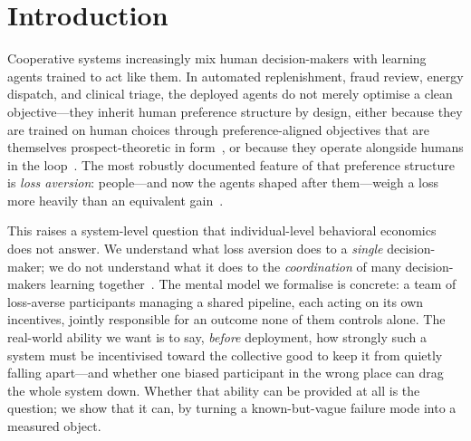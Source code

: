 \documentclass[letterpaper]{article}
\theoremstyle{plain}
\begin{document}
\section{Introduction}
\label{sec:intro}

Cooperative systems increasingly mix human decision-makers with learning agents
trained to act like them. In automated replenishment, fraud review, energy
dispatch, and clinical triage, the deployed agents do not merely optimise a
clean objective---they inherit human preference structure by design, either
because they are trained on human choices through preference-aligned objectives
that are themselves prospect-theoretic in form~\citep{ethayarajh2024kto}, or
because they operate alongside humans in the loop~\citep{lalmohammed2025}. The
most robustly documented feature of that preference structure is \emph{loss
aversion}: people---and now the agents shaped after them---weigh a loss more
heavily than an equivalent gain~\citep{kahneman1979,tversky1992}.

This raises a system-level question that individual-level behavioral economics
does not answer. We understand what loss aversion does to a \emph{single}
decision-maker; we do not understand what it does to the \emph{coordination} of
many decision-makers learning together~\citep{leibo2017multi,lowe2017multi}. The mental model we formalise is
concrete: a team of loss-averse participants managing a shared pipeline, each
acting on its own incentives, jointly responsible for an outcome none of them
controls alone. The real-world ability we want is to say, \emph{before}
deployment, how strongly such a system must be incentivised toward the
collective good to keep it from quietly falling apart---and whether one biased
participant in the wrong place can drag the whole system down. Whether that
ability can be provided at all is the question; we show that it can, by turning
a known-but-vague failure mode into a measured object.

\end{document}
